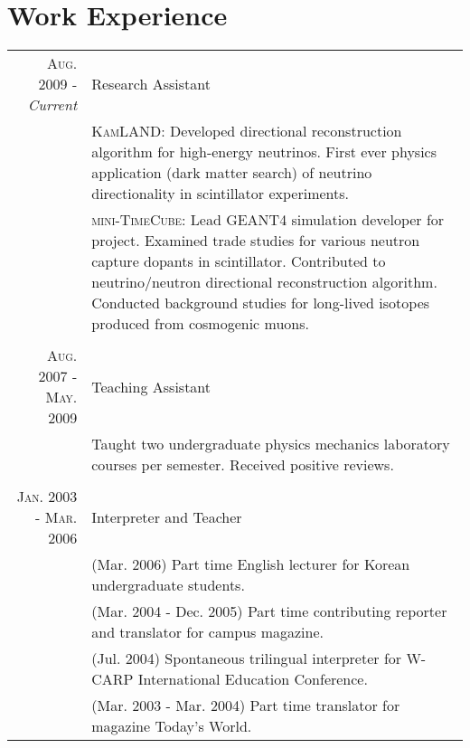 \documentclass[a4paper,10pt]{article} %
\begin{document}

\section{Work Experience}

\begin{tabular}{r|p{10.4cm}}
\textsc{Aug. 2009 - }\textit{Current} & Research Assistant\\
& \footnotesize{
	\textsc{KamLAND}: Developed directional reconstruction algorithm for
	high-energy neutrinos.
	First ever physics application (dark matter search) of neutrino
	directionality in scintillator experiments.
}\\
& \footnotesize{
	\textsc{mini-TimeCube}: Lead GEANT4 simulation developer for project.
	Examined trade studies for various neutron capture dopants in
	scintillator.
	Contributed to neutrino/neutron directional reconstruction algorithm.
	Conducted background studies for long-lived isotopes produced from
	cosmogenic muons.
}\\
\multicolumn{2}{c}{} \\


\textsc{Aug. 2007 - May. 2009} & Teaching Assistant\\
& \footnotesize{
	Taught two undergraduate physics mechanics laboratory courses per semester.
	Received positive reviews.
}\\
\multicolumn{2}{c}{} \\


\textsc{Jan. 2003 - Mar. 2006} & Interpreter and Teacher\\
& \footnotesize{(Mar. 2006) Part time English lecturer for Korean undergraduate
students.}\\
& \footnotesize{(Mar. 2004 - Dec. 2005) Part time contributing reporter and
translator for campus magazine.}\\
& \footnotesize{(Jul. 2004) Spontaneous trilingual interpreter for W-CARP
International Education Conference.}\\
& \footnotesize{(Mar. 2003 - Mar. 2004) Part time translator for magazine Today's World.}\\
\end{tabular}
\end{document}
